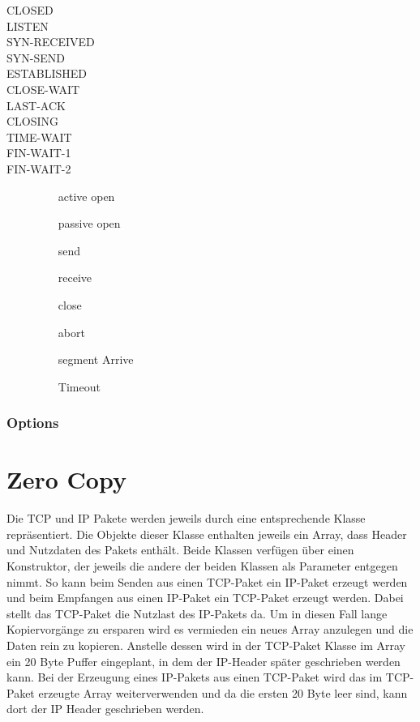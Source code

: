 \begin{description}
\item[CLOSED]

\item[LISTEN]

\item[SYN-RECEIVED]
	
\item[SYN-SEND]
	
\item[ESTABLISHED]

\item[CLOSE-WAIT]

\item[LAST-ACK]

\item[CLOSING]

\item[TIME-WAIT]

\item[FIN-WAIT-1]

\item[FIN-WAIT-2]	
	\begin{itemize}
		\item[active open]
		\item[passive open]
		\item[send]
		\item[receive]
		\item[close]
		\item[abort]
		\item[segment Arrive]
		\item[Timeout]
	\end{itemize}

\end{description}
\subsubsection{Options}

\section{Zero Copy}
Die TCP und IP Pakete werden jeweils durch eine entsprechende Klasse repräsentiert. Die Objekte dieser Klasse enthalten jeweils ein Array, dass Header und Nutzdaten des Pakets enthält. Beide Klassen verfügen über einen Konstruktor, der jeweils die andere der beiden Klassen als Parameter entgegen nimmt. So kann beim Senden aus einen TCP-Paket ein IP-Paket erzeugt werden und beim Empfangen aus einen IP-Paket ein TCP-Paket erzeugt werden. Dabei stellt das TCP-Paket die Nutzlast des IP-Pakets da. Um in diesen Fall lange Kopiervorgänge zu ersparen wird es vermieden ein neues Array anzulegen und die Daten rein zu kopieren. Anstelle dessen wird in der TCP-Paket Klasse im Array ein 20 Byte Puffer eingeplant, in dem der IP-Header später geschrieben werden kann. Bei der Erzeugung eines IP-Pakets aus einen TCP-Paket wird das im TCP-Paket erzeugte Array weiterverwenden und da die ersten 20 Byte leer sind, kann dort der IP Header geschrieben werden.


